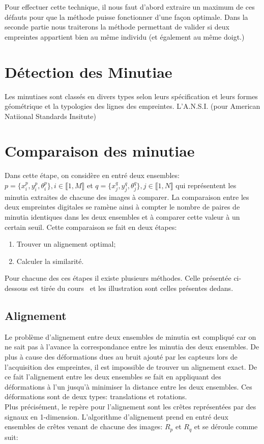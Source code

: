 \documentclass{report}
\begin{document}
Pour effectuer cette technique, il nous faut d'abord extraire un
maximum de ces défauts pour que la méthode puisse fonctionner d'une
façon optimale. Dans la seconde partie nous traiterons la méthode
permettant de valider si deux empreintes appartient bien au même
individu (et également au même doigt.)

\section{Détection des Minutiae}

Les minutiaes sont classés en divers types selon leurs spécification
et leurs formes géométrique et la typologies des lignes des
empreintes. L'A.N.S.I. (pour American Natiional Standards Insitute)

\section{Comparaison des minutiae}

Dans cette étape, on considère en entré deux ensembles: $p =
\{x_{i}^{p}, y_{i}^{p}, \theta_{i}^{p}\}, i \in \llbracket 1, M
\rrbracket$ et $q = \{x_{j}^{q}, y_{j}^{q}, \theta_{j}^{q}\}, j \in
\llbracket 1, N \rrbracket$ qui représentent les minutia extraites de
chacune des images à comparer. La comparaison entre les deux
empreintes digitales se ramène ainsi à compter le nombre de paires de
minutia identiques dans les deux ensembles et à comparer cette valeur
à un certain seuil. Cette comparaison se fait en deux étapes:

\begin{enumerate}
\item Trouver un alignement optimal;
\item Calculer la similarité.
\end{enumerate}

Pour chacune des ces étapes il existe plusieurs méthodes. Celle
présentée ci-dessous est tirée du cours~\cite{finger.00.jain} et les
illustration sont celles présentes dedans.

\subsection{Alignement}

Le problème d'alignement entre deux ensembles de minutia est
compliqué car on ne sait pas à l'avance la correspondance entre les
minutia des deux ensembles. De plus à cause des déformations dues au
bruit ajouté par les capteurs lors de l'acquisition des empreintes, il
est impossible de trouver un alignement exact. De ce fait l'alignement
entre les deux ensembles se fait en appliquant des déformations à l'un
jusqu'à minimiser la distance entre les deux ensembles. Ces
déformations sont de deux types: translations et rotations.\\
Plus précisément, le repère pour l'alignement sont les crêtes
représentées par des signaux en 1-dimension. L'algorithme d'alignement
prend en entré deux ensembles de crêtes venant de chacune des images:
$R_p$ et $R_q$ et se déroule comme suit:
\end{document}
